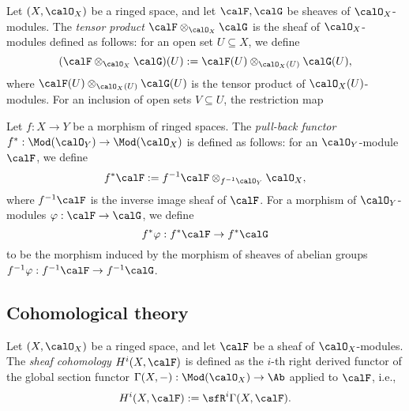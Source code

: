     \begin{definition}\label{def:tensor_product_of_sheaves}
        Let \((X,\calO_X)\) be a ringed space, and let \(\calF,\calG\) be sheaves of \(\calO_X\)-modules.
        The \emph{tensor product} \(\calF \otimes_{\calO_X} \calG\) is the sheaf of \(\calO_X\)-modules defined as follows:
        for an open set \(U\subseteq X\), we define
        \[
            (\calF \otimes_{\calO_X} \calG)(U) := \calF(U) \otimes_{\calO_X(U)} \calG(U),
        \]
        where \(\calF(U) \otimes_{\calO_X(U)} \calG(U)\) is the tensor product of \(\calO_X(U)\)-modules.
        For an inclusion of open sets \(V\subseteq U\), the restriction map

    \end{definition}

    \begin{definition}\label{def:pull_back_of_sheaves}
        Let \(f:X\to Y\) be a morphism of ringed spaces.
        The \emph{pull-back functor} \(f^*:\Mod(\calO_Y)\to \Mod(\calO_X)\) is defined as follows:
        for an \(\calO_Y\)-module \(\calF\), we define
        \[
            f^*\calF := f^{-1}\calF \otimes_{f^{-1}\calO_Y} \calO_X,
        \]
        where \(f^{-1}\calF\) is the inverse image sheaf of \(\calF\).
        For a morphism of \(\calO_Y\)-modules \(\varphi:\calF\to \calG\), we define
        \[
            f^*\varphi: f^*\calF \to f^*\calG
        \]
        to be the morphism induced by the morphism of sheaves of abelian groups \(f^{-1}\varphi:f^{-1}\calF \to f^{-1}\calG\).
    \end{definition}


\subsection{Cohomological theory}

    \begin{definition}\label{def:sheaf_cohomology}
        Let \((X,\calO_X)\) be a ringed space, and let \(\calF\) be a sheaf of \(\calO_X\)-modules.
        The \emph{sheaf cohomology} \(H^i(X,\calF)\) is defined as the \(i\)-th right derived functor of the global section functor \(\Gamma(X,-):\Mod(\calO_X)\to \Ab\) applied to \(\calF\), i.e.,
        \[
            H^i(X,\calF) := \sfR^i\Gamma(X,\calF).
        \]
    \end{definition}

